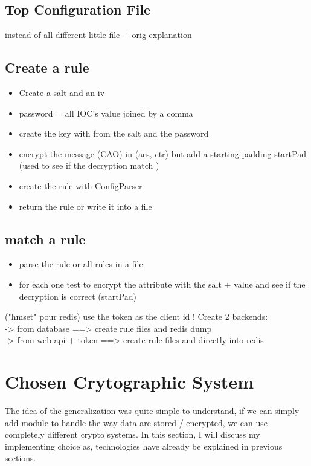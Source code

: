 \documentclass{eplmastersthesis}
\begin{document}
\subsection{Top Configuration File}
instead of all different little file + orig explanation





\subsection{Create a rule}
\begin{itemize}
\item Create a salt and an iv
\item password = all IOC's value joined by a comma
\item create the key with from the salt and the password
\item encrypt the message (CAO) in (aes, ctr) but add a starting padding startPad (used to see if the decryption match )
\item create the rule with ConfigParser 
\item return the rule or write it into a file
\end{itemize}

\subsection{match a rule}
\begin{itemize}
\item parse the rule or all rules in a file
\item for each one test to encrypt the attribute with the salt + value and see if the decryption is correct (startPad)
\end{itemize}

\info("hmset" pour redis)
use the token as the client id !
Create 2 backends:\\
-> from  database ==> create rule files and redis dump \\
-> from web api + token ==> create rule files and directly into redis \\



\section{Chosen Crytographic System}
The idea of the generalization was quite simple to understand, if we can simply add module to handle the way data are stored / encrypted, we can use completely different crypto systems. In this section, I will discuss my implementing choice as, technologies have already be explained in previous sections.
\end{document}
